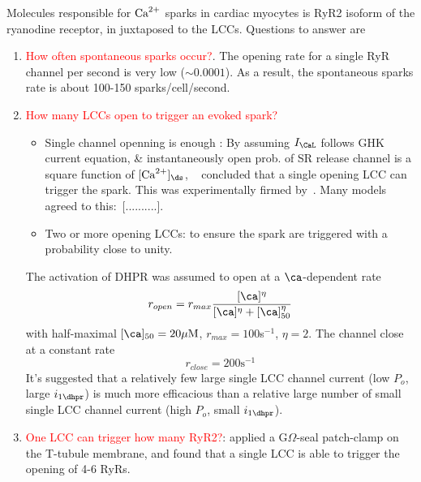 Molecules responsible for ${\text{Ca}^{2+}}$ sparks in cardiac myocytes is RyR2
isoform of the ryanodine receptor, in juxtaposed to the
LCCs. Questions to answer are
\begin{enumerate}

\item \textcolor{red}{How often spontaneous sparks occur?}. The opening rate for
a single RyR channel per second is very low ($\sim 0.0001$)\citep{cheng1993cse}.
As a result, the spontaneous sparks rate is about 100-150 sparks/cell/second.
 
\item 
  \textcolor{red}{How many LCCs open to trigger an evoked spark?}
  \begin{itemize}
  \item Single channel openning is enough \citep{lopez-lopez1995}: By assuming $I_\CaL$
  follows GHK current equation, \& instantaneously open prob. of SR release channel is a square
    function of $[\Ca]_\ds$, ~\citep{santana1996} concluded that a
    single opening LCC can trigger the spark. This was experimentally
    firmed by~\citep{collier1999}. Many models agreed to
    this:~\citep{wier1999}[..........].

  \item Two or more opening LCCs: to ensure the spark are triggered with a
  probability close to unity\citep{inoue2003}. 
  \end{itemize}

  The activation of DHPR was assumed to open at a $\ca$-dependent rate
  \begin{equation}
    \label{eq:997}
    r_{open} = r_{max} \frac{[\ca]^\eta}{[\ca]^\eta+[\ca]_{50}^\eta}
  \end{equation}
  with half-maximal $[\ca]_{50}=20\muM$, $r_{max}=100$s$^{-1}$,
  $\eta=2$. The channel close at a constant rate
  \begin{equation}
    \label{eq:998}
    r_{close} = 200 \text{s}^{-1}
  \end{equation}
  It's suggested that a relatively few large single LCC channel current (low
  $P_o$, large $i_{1\dhpr}$) is much more efficacious than a relative large
  number of small single LCC channel current (high $P_o$, small
  $i_{1\dhpr}$)\citep{lopez-lopez1995}.
  
\item \textcolor{red}{One LCC can trigger how many RyR2?}: \citep{wang2001}
applied a G$\Omega$-seal patch-clamp on the T-tubule membrane, and found that a
single LCC is able to trigger the opening of 4-6 RyRs.


\end{enumerate}
